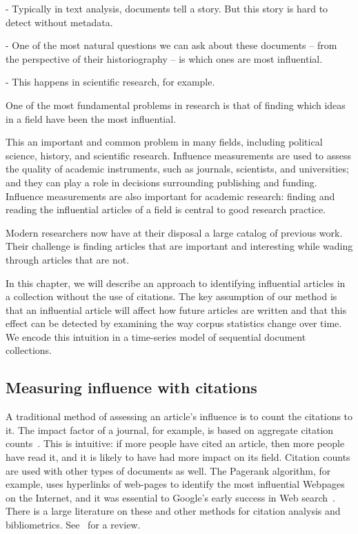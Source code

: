 
- Typically in text analysis, documents tell a story.  But this story
is hard to detect without metadata.

- One of the most natural questions we can ask about these documents
-- from the perspective of their historiography -- is which ones are
most influential.

- This happens in scientific research, for example.

One of the most fundamental problems in research is that of finding
which ideas in a field have been the most influential.

This an important and common problem in many fields, including
political science, history, and scientific research.
Influence measurements are used to assess the quality of academic
instruments, such as journals, scientists, and universities; and they
can play a role in decisions surrounding publishing and funding.
Influence measurements are also important for academic research:
finding and reading the influential articles of a field is central to
good research practice.

Modern researchers now have at their disposal a large catalog of
previous work.  Their challenge is finding articles that are important
and interesting while wading through articles that are not.

In this chapter, we will describe an approach to identifying
influential articles in a collection without the use of citations.
The key assumption of our method is that an influential article will
affect how future articles are written and that this effect can be
detected by examining the way corpus statistics change over time.  We
encode this intuition in a time-series model of sequential document
collections.

\subsection*{Measuring influence with citations}

A traditional method of assessing an article's influence is to count
the citations to it. The impact factor of a journal, for example, is
based on aggregate citation counts~\cite{garfield:2002}.  This is
intuitive: if more people have cited an article, then more people have
read it, and it is likely to have had more impact on its field.
Citation counts are used with other types of documents as well.  The
Pagerank algorithm, for example, uses hyperlinks of web-pages to
identify the most influential Webpages on the Internet, and it was
essential to Google's early success in Web search~\cite{brin:1998}.
There is a large literature on these and other methods for citation
analysis and bibliometrics.  See~\cite{osareh:1996} for a review.


